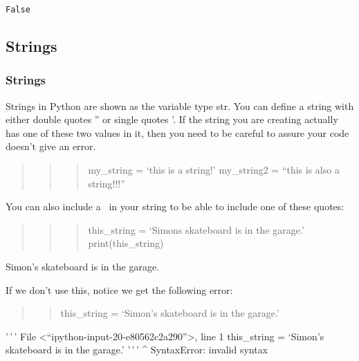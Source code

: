 \documentclass[11pt]{article}
\begin{document}
    \begin{Verbatim}[commandchars=\\\{\}]
False
    \end{Verbatim}

    \hypertarget{strings}{%
\subsection{Strings}\label{strings}}

    \hypertarget{strings}{%
\subsubsection{Strings}\label{strings}}

Strings in Python are shown as the variable type str. You can define a
string with either double quotes '' or single quotes '. If the string
you are creating actually has one of these two values in it, then you
need to be careful to assure your code doesn't give an error.

    \begin{quote}
\begin{quote}
\begin{quote}
my\_string = `this is a string!' my\_string2 = ``this is also a
string!!!''
\end{quote}
\end{quote}
\end{quote}

You can also include a ~in your string to be able to include one of
these quotes:

\begin{quote}
\begin{quote}
\begin{quote}
this\_string = `Simon\textquotesingle s skateboard is in the garage.'
print(this\_string)
\end{quote}
\end{quote}
\end{quote}

Simon's skateboard is in the garage.

    If we don't use this, notice we get the following error:

\begin{quote}
\begin{quote}
this\_string = `Simon's skateboard is in the garage.'
\end{quote}
\end{quote}

'\,'\,' File \textless{}``ipython-input-20-e80562c2a290''\textgreater,
line 1 this\_string = `Simon's skateboard is in the garage.' '\,'\,'
\^{} SyntaxError: invalid syntax
\end{document}
